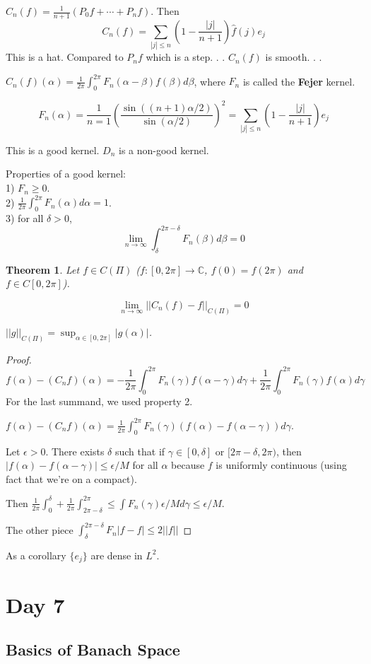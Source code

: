 \documentclass[11pt]{article}
\newtheorem{thm}{Theorem}[section]
\newcommand{\cd}{\cdots}
\newcommand{\ra}{\rightarrow}
\newcommand{\al}{\alpha}
\newcommand{\be}{\beta}
\newcommand{\ga}{\gamma}
\newcommand{\de}{\delta}
\newcommand{\ep}{\epsilon}
\newcommand{\su}[2]{\sum_{#1}^{#2}}
\newcommand{\fr}[2]{\frac{#1}{#2}}
\newcommand{\co}{\mathbb{C}}
\begin{document}
$C_n(f)=\fr{1}{n+1}(P_0f+\cd+P_nf)$. Then \[C_n(f)=\su{|j|\le n}{}\left(1-\fr{|j|}{n+1}\right)\hat f(j)e_j\]
This is a hat. Compared to $P_n f$ which is a step. . .  $C_n(f)$ is smooth. . . 

$C_n(f)(\al)=\fr{1}{2\pi}\int_0^{2\pi}F_n(\al-\be)f(\be)d\be$, where $F_n$ is called the {\bf Fejer} kernel. 

\[F_n(\al)=\fr{1}{n=1}\left(\fr{\sin((n+1)\al/2)}{\sin(\al/2)}\right)^2=\su{|j|\le n}{}\left(1-\fr{|j|}{n+1}\right)e_j\]

This is a good kernel. $D_n$ is a non-good kernel.

Properties of a good kernel: \\
1) $F_n\ge 0$. \\
2) $\fr{1}{2\pi}\int_0^{2\pi}F_n(\al)d\al=1$.\\
3) for all $\de>0$, \[\lim_{n\ra\infty}\int_{\de}^{2\pi-\de}F_n(\be)d\be=0\]

\begin{thm}
Let $f\in C(\Pi)$ ($f:[0,2\pi]\ra\co$, $f(0)=f(2\pi)$ and $f\in C[0,2\pi]$). 

\[\lim_{n\ra\infty}||C_n(f)-f||_{C(\Pi)}=0\]

$||g||_{C(\Pi)}=\sup_{\al\in[0,2\pi]}|g(\al)|$. 
\end{thm}
\begin{proof}
\[f(\al)-(C_nf)(\al)=-\fr{1}{2\pi}\int_0^{2\pi}F_n(\ga)f(\al-\ga)d\ga+\fr{1}{2\pi}\int_0^{2\pi}F_n(\ga)f(\al)d\ga\]
For the last summand, we used property 2. 

$f(\al)-(C_nf)(\al)=\fr{1}{2\pi}\int_0^{2\pi}F_n(\ga)(f(\al)-f(\al-\ga))d\ga$. 

Let $\ep>0$. There exists $\de$ such that if $\ga\in[0,\de]$ or $[2\pi-\de,2\pi)$, then $|f(\al)-f(\al-\ga)|\le \ep/M$ for all $\al$ because $f$ is uniformly continuous (using fact that we're on a compact). 

Then $\fr{1}{2\pi}\int_0^{\de}+\fr{1}{2\pi}\int_{2\pi-\de}^{2\pi}\le \int F_n(\ga)\ep/Md\ga\le\ep/M$. 

The other piece $\int_{\de}^{2\pi-\de}F_n|f-f|\le 2||f||$


\end{proof}

As a corollary $\{e_j\}$ are dense in $L^2$. 

\section{Day 7}

\subsection{Basics of Banach Space}
\end{document}

